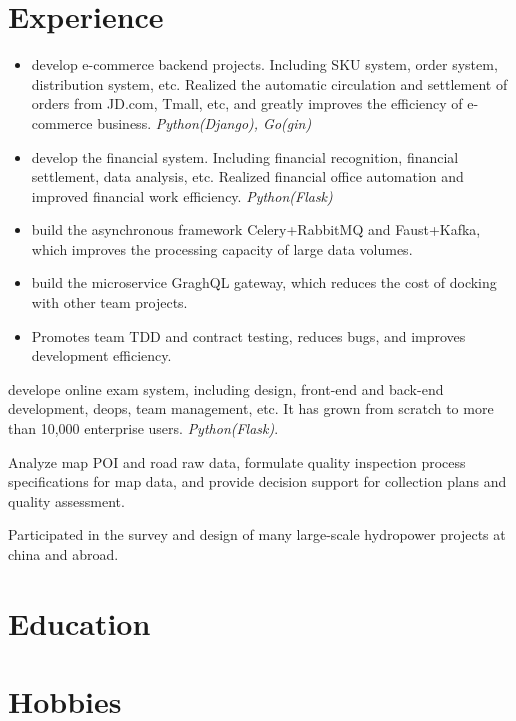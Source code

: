 \documentclass[10pt,a4paper]{moderncv}
\newcommand{\pl}[1]{\textit{\color{plblue} #1}}
\begin{document}
\section{Experience}
{
  \begin{itemize}
    \item develop e-commerce backend projects. Including SKU system, order system, distribution system, etc. Realized the automatic circulation and settlement of orders from JD.com, Tmall, etc, and greatly improves the efficiency of e-commerce business. \pl{Python(Django), Go(gin)}
    \item develop the financial system. Including financial recognition, financial settlement, data analysis, etc. Realized financial office automation and improved financial work efficiency. \pl{Python(Flask)}
    \item build the asynchronous framework Celery+RabbitMQ and Faust+Kafka, which improves the processing capacity of large data volumes.
    \item build the microservice GraghQL gateway, which reduces the cost of docking with other team projects.
    \item Promotes team TDD and contract testing, reduces bugs, and improves development efficiency.
  \end{itemize}
}

{
  develope online exam system, including design, front-end and back-end development, deops, team management, etc. It has grown from scratch to more than 10,000 enterprise users. \pl{Python(Flask)}.
}

{
  Analyze map POI and road raw data, formulate quality inspection process specifications for map data, and provide decision support for collection plans and quality assessment.
}

{
  Participated in the survey and design of many large-scale hydropower projects at china and abroad.
}

\section{Education}
{}

\section{Hobbies}
\end{document}
